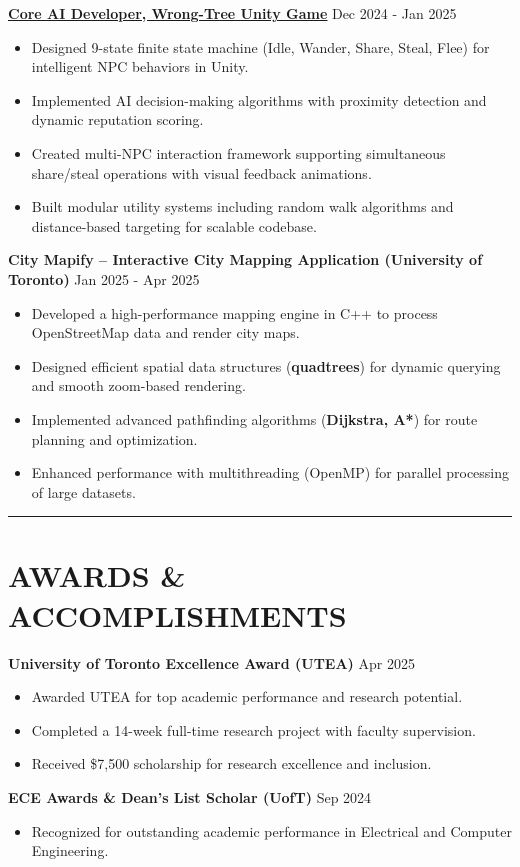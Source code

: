 \documentclass[letterpaper,10pt]{article}
\begin{document}
\vspace{0.2cm}
\noindent\href{https://github.com/XiuShw/Wrong-Tree}{\uline{
\textbf{Core AI Developer, Wrong-Tree Unity Game}}} \hfill Dec 2024 - Jan 2025
\begin{itemize}[leftmargin=0.2in]
    \item Designed 9-state finite state machine (Idle, Wander, Share, Steal, Flee) for intelligent NPC behaviors in Unity.
    \item Implemented AI decision-making algorithms with proximity detection and dynamic reputation scoring.
    \item Created multi-NPC interaction framework supporting simultaneous share/steal operations with visual feedback animations.
    \item Built modular utility systems including random walk algorithms and distance-based targeting for scalable codebase.
\end{itemize}

\vspace{0.2cm}
\noindent\textbf{City Mapify – Interactive City Mapping Application (University of Toronto)} \hfill Jan 2025 - Apr 2025
\begin{itemize}[leftmargin=0.2in]
    \item Developed a high-performance mapping engine in C++ to process OpenStreetMap data and render city maps.
    \item Designed efficient spatial data structures (\textbf{quadtrees}) for dynamic querying and smooth zoom-based rendering.
    \item Implemented advanced pathfinding algorithms (\textbf{Dijkstra, A*}) for route planning and optimization.
    \item Enhanced performance with multithreading (OpenMP) for parallel processing of large datasets.
\end{itemize}

\noindent\rule{\linewidth}{1pt}

\section*{\textbf{AWARDS \& ACCOMPLISHMENTS}}

\noindent\textbf{University of Toronto Excellence Award (UTEA)} \hfill Apr 2025
\begin{itemize}[leftmargin=0.2in]
    \item Awarded UTEA for top academic performance and research potential.
    \item Completed a 14-week full-time research project with faculty supervision.
    \item Received \$7,500 scholarship for research excellence and inclusion.
\end{itemize}

\vspace{0.2cm}
\noindent\textbf{ECE Awards \& Dean's List Scholar (UofT)} \hfill Sep 2024
\begin{itemize}[leftmargin=0.2in]
    \item Recognized for outstanding academic performance in Electrical and Computer Engineering.
\end{itemize}
\end{document}
